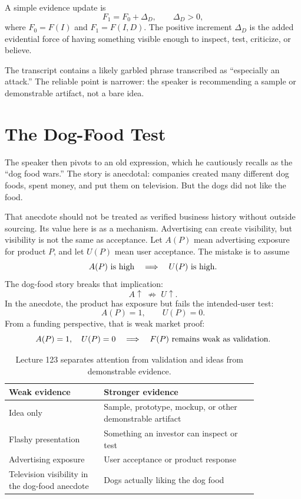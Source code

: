 \documentclass[11pt,oneside]{book}
\begin{document}
A simple evidence update is
\[
F_1=F_0+\Delta_D,
\qquad
\Delta_D>0,
\]
where \(F_0=F(I)\) and \(F_1=F(I,D)\). The positive increment \(\Delta_D\) is the added evidential force of having something visible enough to inspect, test, criticize, or believe.

\begin{remark}
The transcript contains a likely garbled phrase transcribed as ``especially an attack.'' The reliable point is narrower: the speaker is recommending a sample or demonstrable artifact, not a bare idea.
\end{remark}

\section{The Dog-Food Test}

The speaker then pivots to an old expression, which he cautiously recalls as the ``dog food wars.'' The story is anecdotal: companies created many different dog foods, spent money, and put them on television. But the dogs did not like the food.

That anecdote should not be treated as verified business history without outside sourcing. Its value here is as a mechanism. Advertising can create visibility, but visibility is not the same as acceptance. Let \(A(P)\) mean advertising exposure for product \(P\), and let \(U(P)\) mean user acceptance. The mistake is to assume
\[
A(P)\ \hbox{is high}
\quad\Longrightarrow\quad
U(P)\ \hbox{is high}.
\]
The dog-food story breaks that implication:
\[
A\uparrow\;\not\Rightarrow\;U\uparrow.
\]
In the anecdote, the product has exposure but fails the intended-user test:
\[
A(P)=1,\qquad U(P)=0.
\]
From a funding perspective, that is weak market proof:
\[
A(P)=1,\quad U(P)=0
\quad\Longrightarrow\quad
F(P)\ \hbox{remains weak as validation.}
\]

\begin{table}
\centering
\small
\begin{tabular}{p{0.32\linewidth}p{0.52\linewidth}}
\hline
Weak evidence & Stronger evidence \\
\hline
Idea only & Sample, prototype, mockup, or other demonstrable artifact \\
Flashy presentation & Something an investor can inspect or test \\
Advertising exposure & User acceptance or product response \\
Television visibility in the dog-food anecdote & Dogs actually liking the dog food \\
\hline
\end{tabular}
\caption{Lecture 123 separates attention from validation and ideas from demonstrable evidence.}
\end{table}
\end{document}
